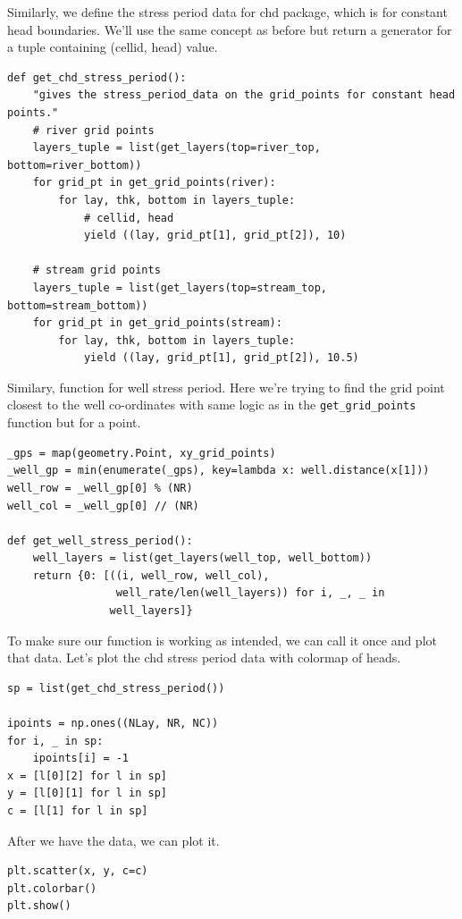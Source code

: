\documentclass[titlepage,12pt]{unisubmission}
\begin{document}
Similarly, we define the stress period data for chd package, which is for constant head boundaries. We'll use the same concept as before but return a generator for a tuple containing (cellid, head) value.

\begin{verbatim}
def get_chd_stress_period():
    "gives the stress_period_data on the grid_points for constant head points."
    # river grid points
    layers_tuple = list(get_layers(top=river_top, bottom=river_bottom))
    for grid_pt in get_grid_points(river):
        for lay, thk, bottom in layers_tuple:
            # cellid, head
            yield ((lay, grid_pt[1], grid_pt[2]), 10)

    # stream grid points
    layers_tuple = list(get_layers(top=stream_top, bottom=stream_bottom))
    for grid_pt in get_grid_points(stream):
        for lay, thk, bottom in layers_tuple:
            yield ((lay, grid_pt[1], grid_pt[2]), 10.5)
\end{verbatim}

Similary, function for well stress period. Here we're trying to find the grid point closest to the well co-ordinates with same logic as in the \texttt{get\_grid\_points} function but for a point.

\begin{verbatim}
_gps = map(geometry.Point, xy_grid_points)
_well_gp = min(enumerate(_gps), key=lambda x: well.distance(x[1]))
well_row = _well_gp[0] % (NR)
well_col = _well_gp[0] // (NR)

def get_well_stress_period():
    well_layers = list(get_layers(well_top, well_bottom))
    return {0: [((i, well_row, well_col),
                 well_rate/len(well_layers)) for i, _, _ in
                well_layers]}
\end{verbatim}

To make sure our function is working as intended, we can call it once and plot that data. Let's plot the chd stress period data with colormap of heads.

\begin{verbatim}
sp = list(get_chd_stress_period())

ipoints = np.ones((NLay, NR, NC))
for i, _ in sp:
    ipoints[i] = -1
x = [l[0][2] for l in sp]
y = [l[0][1] for l in sp]
c = [l[1] for l in sp]
\end{verbatim}

After we have the data, we can plot it.
\begin{verbatim}
plt.scatter(x, y, c=c)
plt.colorbar()
plt.show()
\end{verbatim}
\end{document}
